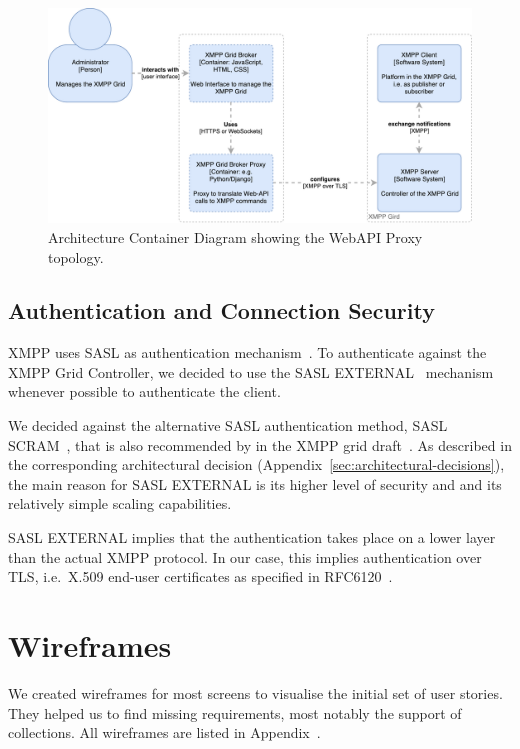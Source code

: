 \begin{figure}[h]
\centering
\includegraphics[width=0.7\linewidth]{resources/architecture_container_proxy.pdf}
\caption[Architecture Container Diagram: Web Proxy]{Architecture Container Diagram showing the WebAPI Proxy topology.}
\label{fig:architecturecontainerwebproxy}
\end{figure}


\subsection{Authentication and Connection Security}

XMPP uses SASL as authentication mechanism~\cite{rfc6120}.
To authenticate against the XMPP Grid Controller, we decided to use the SASL EXTERNAL~\cite{rfc4422} mechanism whenever possible to authenticate the client.

We decided against the alternative SASL authentication method, SASL SCRAM~\cite{rfc7677}, that is also recommended by in the XMPP grid draft~\cite{ietf-mile-xmpp-grid-05}.
As described in the corresponding architectural decision (Appendix~\ref{sec:architectural-decisions}), the main reason for SASL EXTERNAL is its higher level of security and and its relatively simple scaling capabilities.

SASL EXTERNAL implies that the authentication takes place on a lower layer than the actual XMPP protocol. In our case, this implies authentication over TLS, i.e.~X.509 end-user certificates as specified in RFC6120~\cite{rfc6120}.


\section{Wireframes}

We created wireframes for most screens to visualise the initial set of user stories.
They helped us to find missing requirements, most notably the support of collections.
All wireframes are listed in Appendix~.

